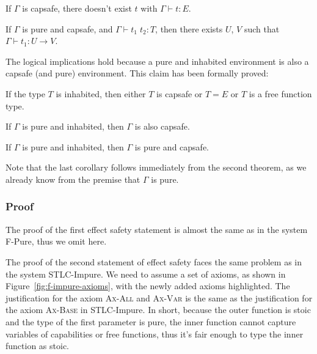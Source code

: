 \begin{definition}
  If $\Gamma$ is capsafe, there doesn't exist $t$ with
  $\Gamma \vdash t : E$.
\end{definition}

\begin{definition}
  If $\Gamma$ is pure and capsafe, and $\Gamma \vdash t_1 \; t_2 : T$,
  then there exists $U$, $V$ such that $\Gamma \vdash t_1 : U \to V$.
\end{definition}

The logical implications hold because a pure and inhabited
environment is also a capsafe (and pure) environment. This claim has
been formally proved:

\begin{lemma}
  If the type $T$ is inhabited, then either $T$ is capsafe or
  $T = E$ or $T$ is a free function type.
\end{lemma}

\begin{theorem}
  If $\Gamma$ is pure and inhabited, then $\Gamma$ is also capsafe.
\end{theorem}

\begin{corollary}
  If $\Gamma$ is pure and inhabited, then $\Gamma$ is pure and
  capsafe.
\end{corollary}

Note that the last corollary follows immediately from the second
theorem, as we already know from the premise that $\Gamma$ is pure.

\subsubsection{Proof}

The proof of the first effect safety statement is almost the same as
in the system F-Pure, thus we omit here.

The proof of the second statement of effect safety faces the same
problem as in the system STLC-Impure. We need to assume a set of
axioms, as shown in Figure~\ref{fig:f-impure-axioms}, with the newly
added axioms highlighted. The justification for the axiom
\textsc{Ax-All} and \textsc{Ax-Var} is the same as the justification
for the axiom \textsc{Ax-Base} in STLC-Impure. In short, because the
outer function is stoic and the type of the first parameter is pure,
the inner function cannot capture variables of capabilities or free
functions, thus it's fair enough to type the inner function as stoic.

